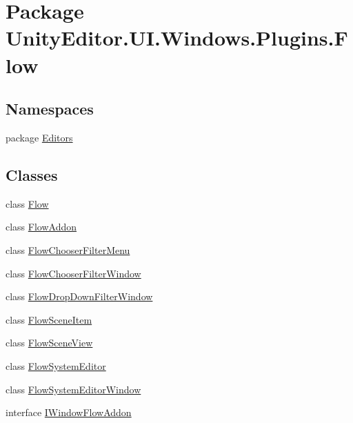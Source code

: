 \hypertarget{namespace_unity_editor_1_1_u_i_1_1_windows_1_1_plugins_1_1_flow}{}\section{Package Unity\+Editor.\+U\+I.\+Windows.\+Plugins.\+Flow}
\label{namespace_unity_editor_1_1_u_i_1_1_windows_1_1_plugins_1_1_flow}
\subsection*{Namespaces}
\begin{DoxyCompactItemize}
\item 
package \hyperlink{namespace_unity_editor_1_1_u_i_1_1_windows_1_1_plugins_1_1_flow_1_1_editors}{Editors}
\end{DoxyCompactItemize}
\subsection*{Classes}
\begin{DoxyCompactItemize}
\item 
class \hyperlink{class_unity_editor_1_1_u_i_1_1_windows_1_1_plugins_1_1_flow_1_1_flow}{Flow}
\item 
class \hyperlink{class_unity_editor_1_1_u_i_1_1_windows_1_1_plugins_1_1_flow_1_1_flow_addon}{Flow\+Addon}
\item 
class \hyperlink{class_unity_editor_1_1_u_i_1_1_windows_1_1_plugins_1_1_flow_1_1_flow_chooser_filter_menu}{Flow\+Chooser\+Filter\+Menu}
\item 
class \hyperlink{class_unity_editor_1_1_u_i_1_1_windows_1_1_plugins_1_1_flow_1_1_flow_chooser_filter_window}{Flow\+Chooser\+Filter\+Window}
\item 
class \hyperlink{class_unity_editor_1_1_u_i_1_1_windows_1_1_plugins_1_1_flow_1_1_flow_drop_down_filter_window}{Flow\+Drop\+Down\+Filter\+Window}
\item 
class \hyperlink{class_unity_editor_1_1_u_i_1_1_windows_1_1_plugins_1_1_flow_1_1_flow_scene_item}{Flow\+Scene\+Item}
\item 
class \hyperlink{class_unity_editor_1_1_u_i_1_1_windows_1_1_plugins_1_1_flow_1_1_flow_scene_view}{Flow\+Scene\+View}
\item 
class \hyperlink{class_unity_editor_1_1_u_i_1_1_windows_1_1_plugins_1_1_flow_1_1_flow_system_editor}{Flow\+System\+Editor}
\item 
class \hyperlink{class_unity_editor_1_1_u_i_1_1_windows_1_1_plugins_1_1_flow_1_1_flow_system_editor_window}{Flow\+System\+Editor\+Window}
\item 
interface \hyperlink{interface_unity_editor_1_1_u_i_1_1_windows_1_1_plugins_1_1_flow_1_1_i_window_flow_addon}{I\+Window\+Flow\+Addon}
\end{DoxyCompactItemize}
